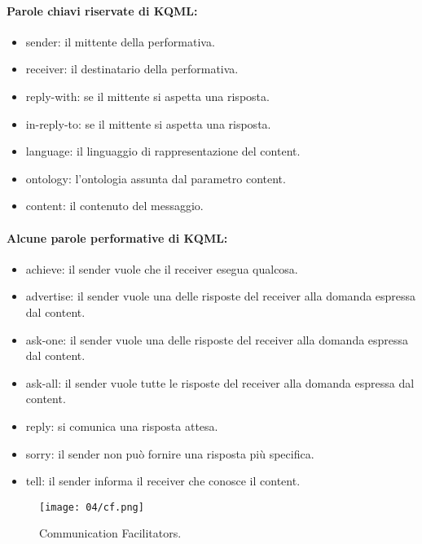 \paragraph{Parole chiavi riservate di KQML:}

\begin{itemize}
  \item sender: il mittente della performativa. 
  \item receiver: il destinatario della performativa. 
  \item reply-with: se il mittente si aspetta una risposta. 
  \item in-reply-to: se il mittente si aspetta una risposta. 
  \item language: il linguaggio di rappresentazione del content.
  \item ontology: l'ontologia assunta dal parametro content. 
  \item content: il contenuto del messaggio. 
\end{itemize}

\paragraph{Alcune parole performative di KQML:}

\begin{itemize}
  \item achieve: il sender vuole che il receiver esegua qualcosa. 
  \item advertise: il sender vuole una delle risposte del receiver alla domanda espressa dal content. 
  \item ask-one: il sender vuole una delle risposte del receiver alla domanda espressa dal content. 
  \item ask-all: il sender vuole tutte le risposte del receiver alla domanda espressa dal content. 
  \item reply: si comunica una risposta attesa. 
  \item sorry: il sender non può fornire una risposta più specifica. 
  \item tell: il sender informa il receiver che conosce il content.
\end{itemize}


\begin{figure}[!h]
    \centering
    \texttt{[image: 04/cf.png]}
  \caption{Communication Facilitators.}
\end{figure}

